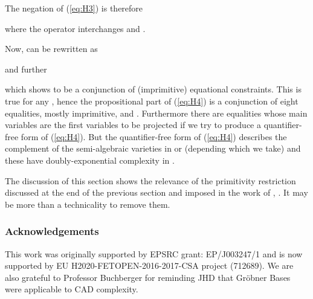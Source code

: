 \documentclass{llncs}
\begin{document}
The negation of  (\ref{eq:H3}) is therefore

where the  operator interchanges  and .

Now,  can be rewritten as

and further

which shows  to be a conjunction of (imprimitive) equational constraints. This is true for any , hence  the propositional part of (\ref{eq:H4}) is a conjunction of eight equalities, mostly imprimitive, and .  Furthermore there are equalities whose main variables are the first variables to be projected if we try to produce a quantifier-free form of (\ref{eq:H4}). But the quantifier-free form of (\ref{eq:H4}) describes the complement of the semi-algebraic varieties in \cite{BD07} or \cite{DH88}  (depending which  we take) and these have doubly-exponential complexity in .

The discussion of this section shows the relevance of the primitivity restriction discussed at the end of the previous section and imposed in the work of \cite{EBD15}, \cite{ED16}.  It may be more than a technicality to remove them.


\subsubsection*{Acknowledgements}


This work was originally supported by EPSRC grant: EP/J003247/1 and is now supported by EU H2020-FETOPEN-2016-2017-CSA project  (712689).  
We are also grateful to Professor Buchberger for reminding JHD that Gr\"obner Bases were applicable to CAD complexity.
\end{document}
